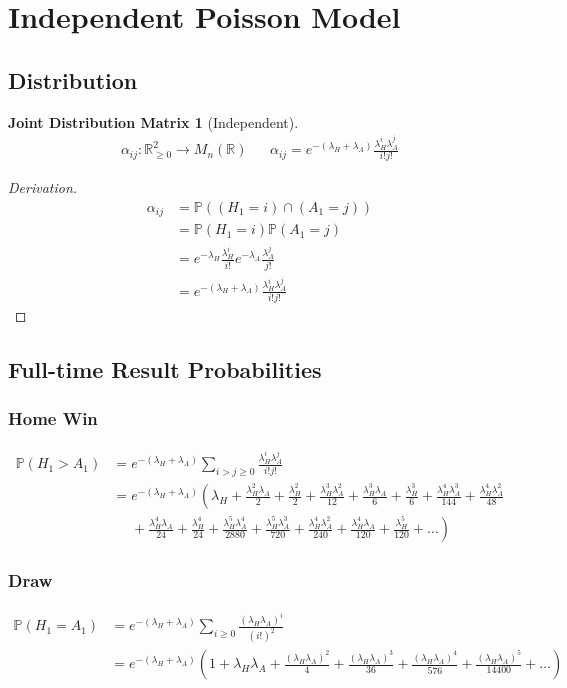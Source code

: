 \documentclass[a4paper,11pt,oneside]{book}
\theoremstyle{plain}
\newtheorem*{jdm}{Joint Distribution Matrix}
\theoremstyle{definition}
\begin{document}
\section{Independent Poisson Model}
\subsection{Distribution}
\begin{jdm}[Independent]
\begin{align*}
\alpha_{ij}: \mathbb{R}^2_{\ge 0} \rightarrow M_n(\mathbb{R}) && \alpha_{ij}=e^{-(\lambda_H+\lambda_A)}\frac{\lambda_H^i\lambda_A^j}{i!j!}
\end{align*}
\end{jdm}
\begin{proof}[Derivation]
\begin{align*}
\alpha_{ij}&=\mathbb{P}((H_1=i)\cap (A_1=j))\\
&=\mathbb{P}(H_1=i)\mathbb{P}(A_1=j)\\
&=e^{-\lambda_H}\frac{\lambda_H^i}{i!}e^{-\lambda_A}\frac{\lambda_A^j}{j!}\\
&=e^{-(\lambda_H+\lambda_A)}\frac{\lambda_H^i\lambda_A^j}{i!j!}
\end{align*}
\end{proof}
\subsection{Full-time Result Probabilities}
\subsubsection{Home Win}
\begin{align*}
\mathbb{P}(H_1>A_1)&=e^{-(\lambda_H+\lambda_A)}\sum_{i>j\ge 0}\frac{\lambda_H^i\lambda_A^j}{i!j!}\\
&=e^{-(\lambda_H+\lambda_A)}\left(\lambda_H+\frac{\lambda_H^2\lambda_A}{2}+\frac{\lambda_H^2}{2}+\frac{\lambda_H^3\lambda_A^2}{12}+\frac{\lambda_H^3\lambda_A}{6}+\frac{\lambda_H^3}{6}+\frac{\lambda_H^4\lambda_A^3}{144}+\frac{\lambda_H^4\lambda_A^2}{48}\right.\\
&\left.\phantom{=}+\frac{\lambda_H^4\lambda_A}{24}+\frac{\lambda_H^4}{24}+\frac{\lambda_H^5\lambda_A^4}{2880}+\frac{\lambda_H^5\lambda_A^3}{720}+\frac{\lambda_H^4\lambda_A^2}{240}+\frac{\lambda_H^4\lambda_A}{120}+\frac{\lambda_H^5}{120}+\ldots\right)
\end{align*}
\subsubsection{Draw}
\begin{align*}
\mathbb{P}(H_1=A_1)&=e^{-(\lambda_H+\lambda_A)}\sum_{i\ge 0}\frac{(\lambda_H\lambda_A)^i}{(i!)^2}\\
&=e^{-(\lambda_H+\lambda_A)}\left(1+\lambda_H\lambda_A+\frac{(\lambda_H\lambda_A)^2}{4}+\frac{(\lambda_H\lambda_A)^3}{36}+\frac{(\lambda_H\lambda_A)^4}{576}+\frac{(\lambda_H\lambda_A)^5}{14400}+\ldots\right)
\end{align*}
\end{document}
